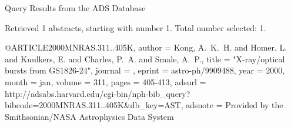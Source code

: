 Query Results from the ADS Database


Retrieved 1 abstracts, starting with number 1.  Total number selected: 1.

@ARTICLE{2000MNRAS.311..405K,
   author = {{Kong}, A.~K.~H. and {Homer}, L. and {Kuulkers}, E. and {Charles}, P.~A. and 
	{Smale}, A.~P.},
    title = "{X-ray/optical bursts from GS1826-24}",
  journal = {\mnras},
   eprint = {astro-ph/9909488},
     year = 2000,
    month = jan,
   volume = 311,
    pages = {405-413},
   adsurl = {http://adsabs.harvard.edu/cgi-bin/nph-bib_query?bibcode=2000MNRAS.311..405K&db_key=AST},
  adsnote = {Provided by the Smithsonian/NASA Astrophysics Data System}
}


